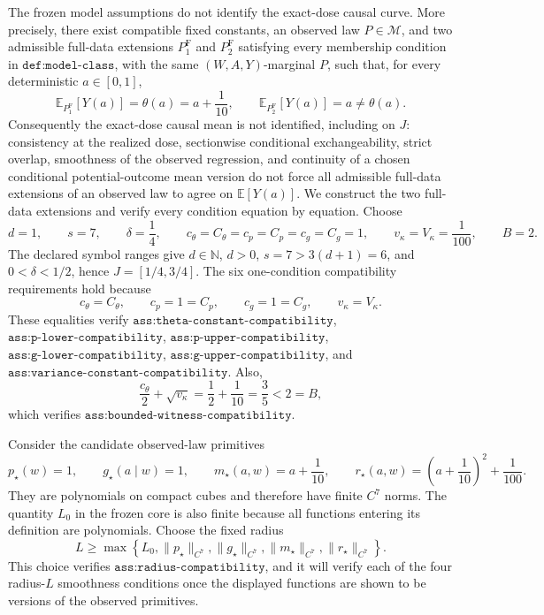 The frozen model assumptions do not identify the exact-dose causal curve.  More precisely, there exist compatible fixed constants, an observed law \(P\in\mathcal M\), and two admissible full-data extensions \(P^{\mathrm F}_1\) and \(P^{\mathrm F}_2\) satisfying every membership condition in \(\texttt{def:model-class}\), with the same \((W,A,Y)\)-marginal \(P\), such that, for every deterministic \(a\in[0,1]\),
\[
 \mathbb E_{P^{\mathrm F}_1}[Y(a)]=\theta(a)=a+\frac{1}{10},
 \qquad
 \mathbb E_{P^{\mathrm F}_2}[Y(a)]=a\ne\theta(a).
\]
Consequently the exact-dose causal mean is not identified, including on \(J\): consistency at the realized dose, sectionwise conditional exchangeability, strict overlap, smoothness of the observed regression, and continuity of a chosen conditional potential-outcome mean version do not force all admissible full-data extensions of an observed law to agree on \(\mathbb E[Y(a)]\).
We construct the two full-data extensions and verify every condition equation by equation.  Choose
\[
 d=1,\qquad s=7,\qquad \delta=\frac14,\qquad
 c_{\theta}=C_{\theta}=c_p=C_p=c_g=C_g=1,
 \qquad v_{\kappa}=V_{\kappa}=\frac1{100},\qquad B=2.
\]
The declared symbol ranges give \(d\in\mathbb N\), \(d>0\), \(s=7>3(d+1)=6\), and \(0<\delta<1/2\), hence \(J=[1/4,3/4]\).  The six one-condition compatibility requirements hold because
\[
 c_{\theta}=C_{\theta},\qquad c_p=1=C_p,\qquad
 c_g=1=C_g,\qquad v_{\kappa}=V_{\kappa}.
\]
These equalities verify \(\texttt{ass:theta-constant-compatibility}\), \(\texttt{ass:p-lower-compatibility}\), \(\texttt{ass:p-upper-compatibility}\), \(\texttt{ass:g-lower-compatibility}\), \(\texttt{ass:g-upper-compatibility}\), and \(\texttt{ass:variance-constant-compatibility}\).  Also,
\[
 \frac{c_{\theta}}2+\sqrt{v_{\kappa}}
 =\frac12+\frac1{10}=\frac35<2=B,
\]
which verifies \(\texttt{ass:bounded-witness-compatibility}\).

Consider the candidate observed-law primitives
\[
 p_\star(w)=1,\qquad g_\star(a\mid w)=1,\qquad
 m_\star(a,w)=a+\frac1{10},\qquad
 r_\star(a,w)=\left(a+\frac1{10}\right)^2+\frac1{100}.
\]
They are polynomials on compact cubes and therefore have finite \(C^7\) norms.  The quantity \(L_0\) in the frozen core is also finite because all functions entering its definition are polynomials.  Choose the fixed radius
\[
 L\ge \max\left\{L_0,\lVert p_\star\rVert_{C^7},
 \lVert g_\star\rVert_{C^7},\lVert m_\star\rVert_{C^7},
 \lVert r_\star\rVert_{C^7}\right\}.
\]
This choice verifies \(\texttt{ass:radius-compatibility}\), and it will verify each of the four radius-\(L\) smoothness conditions once the displayed functions are shown to be versions of the observed primitives.

